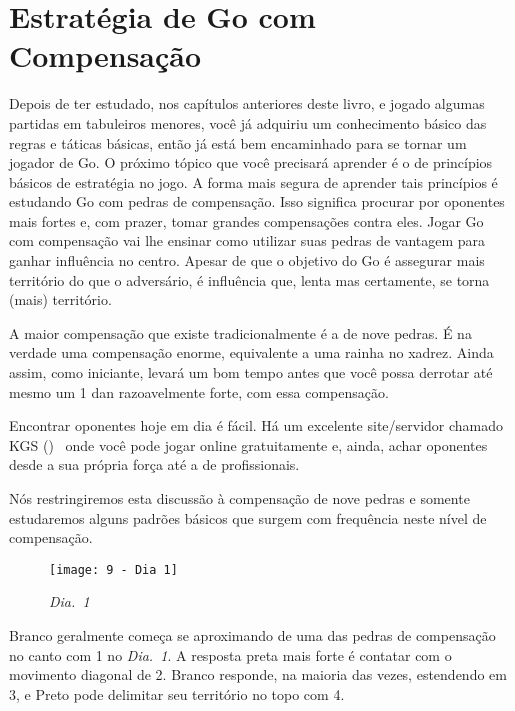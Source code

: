 \chapter{Estratégia de Go com Compensação}\label{chap:estrat_comp}

Depois de ter estudado, nos capítulos anteriores deste livro, e jogado algumas partidas em tabuleiros menores, você já adquiriu um conhecimento básico das regras e táticas básicas, então já está bem encaminhado para se tornar um jogador de Go. O próximo tópico que você precisará aprender é o de princípios básicos de estratégia no jogo. A forma mais segura de aprender tais princípios é estudando Go com pedras de compensação. Isso significa procurar por oponentes mais fortes e, com prazer, tomar grandes compensações contra eles. Jogar Go com compensação vai lhe ensinar como utilizar suas pedras de vantagem para ganhar influência no centro. Apesar de que o objetivo do Go é assegurar mais território do que o adversário, é influência que, lenta mas certamente, se torna (mais) território.

A maior compensação que existe tradicionalmente é a de nove pedras. É na verdade uma compensação enorme, equivalente a uma rainha no xadrez. Ainda assim, como iniciante, levará um bom tempo antes que você possa derrotar até mesmo um 1 dan razoavelmente forte, com essa compensação.

Encontrar oponentes hoje em dia é fácil. Há um excelente site/servidor chamado KGS (\href{https://www.gokgs.com}{})~\cite{kgs} onde você pode jogar online gratuitamente e, ainda, achar oponentes desde a sua própria força até a de profissionais.

Nós restringiremos esta discussão à compensação de nove pedras e somente estudaremos alguns padrões básicos que surgem com frequência neste nível de compensação.

\pagebreak

\begin{wrapfigure}{r}{60mm}
    \vspace{-15pt}
    \begin{center}
        \texttt{[image: 9 - Dia 1]}
        \captionsetup{justification=centering}
        \caption*{\emph{Dia.\@~1}}
    \end{center}
    \vspace{-20pt}
\end{wrapfigure}

Branco geralmente começa se aproximando de uma das pedras de compensação no canto com 1 no \emph{Dia.\@~1}. A resposta preta mais forte é contatar com o movimento diagonal de 2. Branco responde, na maioria das vezes, estendendo em 3, e Preto pode delimitar seu território no topo com 4.

